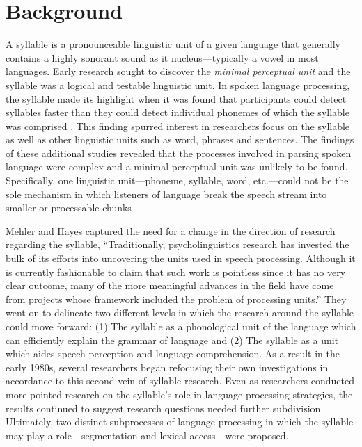 \documentclass[
12pt, %
english, %
doublespacing, %
nolistspacing, %
liststotoc, %
headsepline, %
chapterinoneline, %
openany, %
]{DoctoralThesis}\usepackage[]{graphicx}\usepackage[]{color}
\begin{document}
\section{Background}
A syllable is a pronounceable linguistic unit of a given language that generally contains a highly sonorant sound as it nucleus—typically a vowel in most languages. Early research sought to discover the \emph{minimal perceptual unit} and the syllable was a logical and testable linguistic unit. In spoken language processing, the syllable made its highlight when it was found that participants could detect syllables faster than they could detect individual phonemes of which the syllable was comprised \citep*{Savin1970-oy}. This finding spurred interest in researchers focus on the syllable as well as other linguistic units such as word, phrases and sentences. The findings of these additional studies revealed that the processes involved in parsing spoken language were complex and a minimal perceptual unit was unlikely to be found. %
Specifically, one linguistic unit—phoneme, syllable, word, etc.—could not be the sole mechanism in which listeners of language break the speech stream into smaller or processable chunks \citep{Foss1973-ll,Healy1976-js,McNeill1973-bo}. 

Mehler and Hayes \parencite*{Mehler1981-wp} captured the need for a change in the direction of research regarding the syllable, “Traditionally, psycholinguistics research has invested the bulk of its efforts into uncovering the units used in speech processing. Although it is currently fashionable to claim that such work is pointless since it has no very clear outcome, many of the more meaningful advances in the field have come from projects whose framework included the problem of processing units.” They went on to delineate two different levels in which the research around the syllable could move forward: (1) The syllable as a phonological unit of the language which can efficiently explain the grammar of language and (2) The syllable as a unit which aides speech perception and language comprehension. As a result in the early 1980s, several researchers began refocusing their own investigations in accordance to this second vein of syllable research. %
Even as researchers conducted more pointed research on the syllable's role in language processing strategies, the results continued to suggest research questions needed further subdivision. Ultimately, two distinct subprocesses of language processing in which the syllable may play a role---segmentation and lexical access---were proposed. 
\end{document}
